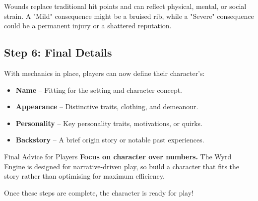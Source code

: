 Wounds replace traditional hit points and can reflect physical, mental, or social strain. A "Mild" consequence might be a bruised rib, while a "Severe" consequence could be a permanent injury or a shattered reputation.

\subsection{Step 6: Final Details}

With mechanics in place, players can now define their character’s:
\begin{itemize}
    \item \textbf{Name} – Fitting for the setting and character concept.
    \item \textbf{Appearance} – Distinctive traits, clothing, and demeanour.
    \item \textbf{Personality} – Key personality traits, motivations, or quirks.
    \item \textbf{Backstory} – A brief origin story or notable past experiences.
\end{itemize}

\begin{DndComment}{Final Advice for Players}
\textbf{Focus on character over numbers.} The Wyrd Engine is designed for narrative-driven play, so build a character that fits the story rather than optimising for maximum efficiency.
\end{DndComment}

Once these steps are complete, the character is ready for play!



